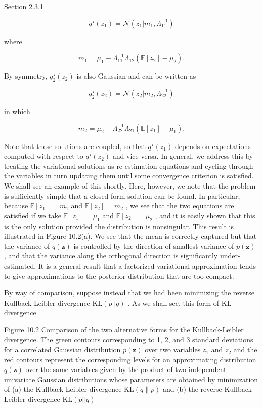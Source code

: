 \documentclass[
  10
]{article}
\begin{document}
Section 2.3.1

\[
q ^ {\star} (z _ {1}) = \mathcal {N} (z _ {1} | m _ {1}, \Lambda_ {1 1} ^ {- 1})\tag{10.12}
\]

where

\[
m _ {1} = \mu_ {1} - \Lambda_ {1 1} ^ {- 1} \Lambda_ {1 2} \left(\mathbb {E} [ z _ {2} ] - \mu_ {2}\right).\tag{10.13}
\]

By symmetry, \(q _ { 2 } ^ { \star } ( z _ { 2 } )\) is also Gaussian
and can be written as

\[
q _ {2} ^ {\star} (z _ {2}) = \mathcal {N} (z _ {2} | m _ {2}, \Lambda_ {2 2} ^ {- 1})\tag{10.14}
\]

in which

\[
m _ {2} = \mu_ {2} - \Lambda_ {2 2} ^ {- 1} \Lambda_ {2 1} \left(\mathbb {E} [ z _ {1} ] - \mu_ {1}\right).\tag{10.15}
\]

Note that these solutions are coupled, so that
\(q ^ { \star } ( z _ { 1 } )\) depends on expectations computed with
respect to \(q ^ { \star } ( z _ { 2 } )\) and vice versa. In general,
we address this by treating the variational solutions as re-estimation
equations and cycling through the variables in turn updating them until
some convergence criterion is satisfied. We shall see an example of this
shortly. Here, however, we note that the problem is sufficiently simple
that a closed form solution can be found. In particular, because
\(\mathbb { E } [ z _ { 1 } ] = m _ { 1 }\) and
\(\mathbb { E } [ z _ { 2 } ] = m _ { 2 }\) , we see that the two
equations are satisfied if we take
\(\mathbb { E } [ z _ { 1 } ] = \mu _ { 1 }\) and
\(\mathbb { E } [ z _ { 2 } ] = \mu _ { 2 }\) , and it is easily shown
that this is the only solution provided the distribution is nonsingular.
This result is illustrated in Figure 10.2(a). We see that the mean is
correctly captured but that the variance of \(q ( \mathbf { z } )\) is
controlled by the direction of smallest variance of
\(p ( \mathbf { z } )\) , and that the variance along the orthogonal
direction is significantly under-estimated. It is a general result that
a factorized variational approximation tends to give approximations to
the posterior distribution that are too compact.

By way of comparison, suppose instead that we had been minimizing the
reverse Kullback-Leibler divergence \(\mathrm { K L } ( p | | q )\) . As
we shall see, this form of KL divergence

Figure 10.2 Comparison of the two alternative forms for the
Kullback-Leibler divergence. The green contours corresponding to 1, 2,
and 3 standard deviations for a correlated Gaussian distribution
\(p ( \mathbf { z } )\) over two variables \(z _ { 1 }\) and
\(z _ { 2 }\) and the red contours represent the corresponding levels
for an approximating distribution \(q ( \mathbf { z } )\) over the same
variables given by the product of two independent univariate Gaussian
distributions whose parameters are obtained by minimization of (a) the
Kullback-Leibler divergence \(\mathrm { K L } ( q \| p )\) and (b) the
reverse Kullback-Leibler divergence \(\mathrm { K L } ( p | | q )\)
\end{document}
